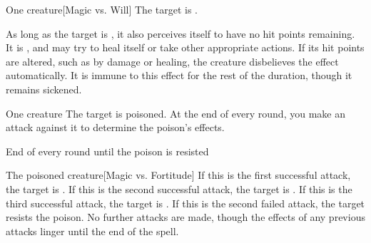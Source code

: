 \begin{spellheader}
    \spellrng{\rngmed}
    \spelldur{\durshort}
\end{spellheader}
\begin{spelleffects}
    \begin{spelltarget}{One creature}[Magic vs. Will]
        \spellsuccess The target is \sickened.

        As long as the target is \bloodied, it also perceives itself to have no hit points remaining. It is \staggered, and may try to heal itself or take other appropriate actions. If its hit points are altered, such as by damage or healing, the creature disbelieves the effect automatically. It is immune to this effect for the rest of the duration, though it remains sickened.
    \end{spelltarget}
\end{spelleffects}

\begin{spellheader}
    \spellrng{\rngclose}
\end{spellheader}
\begin{spelleffects}
    \begin{spelltarget}{One creature}
        \spelleffect The target is poisoned. At the end of every round, you make an attack against it to determine the poison's effects.
    \end{spelltarget}
    \begin{spelltrigger}{End of every round until the poison is resisted}
        \begin{spelltarget}{The poisoned creature}[Magic vs. Fortitude]
            \spellsuccess If this is the first successful attack, the target is \sickened. If this is the second successful attack, the target is \staggered. If this is the third successful attack, the target is \paralyzed.
            \spellfailure If this is the second failed attack, the target resists the poison. No further attacks are made, though the effects of any previous attacks linger until the end of the spell.
        \end{spelltarget}
    \end{spelltrigger}
\end{spelleffects}


